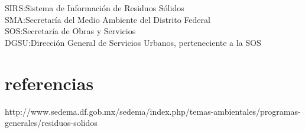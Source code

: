 \textbullet SIRS:Sistema de Información de Residuos Sólidos\\

\textbullet SMA:Secretaría del Medio Ambiente del Distrito Federal\\

\textbullet SOS:Secretaría de Obras y Servicios\\

\textbullet DGSU:Dirección General de Servicios Urbanos, perteneciente a la SOS\\


\section{referencias}
http://www.sedema.df.gob.mx/sedema/index.php/temas-ambientales/programas-generales/residuos-solidos

